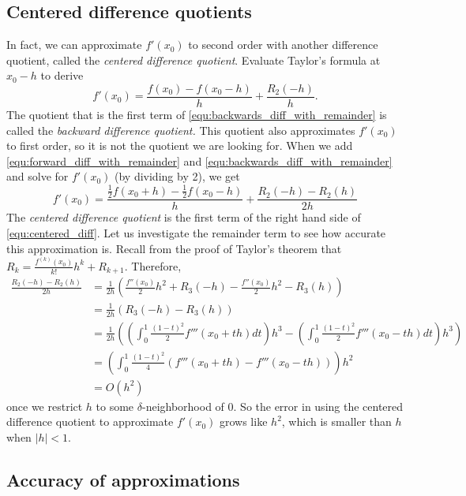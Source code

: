 \subsection*{Centered difference quotients}
In fact, we can approximate $f'(x_0)$ to second order with another difference quotient, called the \emph{centered difference quotient}. 
Evaluate Taylor's formula at $x_0-h$ to derive
\begin{equation}\label{equ:backwards_diff_with_remainder}
f'(x_0) = \frac{f(x_0)-f(x_0-h)}{h} + \frac{R_2(-h)}{h}.
\end{equation}
The quotient that is the first term of \eqref{equ:backwards_diff_with_remainder} is called the \emph{backward difference quotient.} 
This quotient also approximates $f'(x_0)$ to first order, so it is not the quotient we are looking for. 
When we add \eqref{equ:forward_diff_with_remainder} and \eqref{equ:backwards_diff_with_remainder} and solve for $f'(x_0)$ (by dividing by 2), we get
\begin{equation}\label{equ:centered_diff}
f'(x_0) = \frac{\frac{1}{2}f(x_0+h) - \frac{1}{2}f(x_0-h)}{h} + \frac{R_2(-h) - R_2(h)}{2h}
\end{equation}
The \emph{centered difference quotient} is the first term of the right hand side of \eqref{equ:centered_diff}. 
Let us investigate the remainder term to see how accurate this approximation is. 
Recall from the proof of Taylor's theorem that $R_k = \frac{f^{(k)}(x_0)}{k!}h^k + R_{k+1}$. Therefore,
\begin{align*}
\frac{R_2(-h) - R_2(h)}{2h} &= \frac{1}{2h}\left(\frac{f''(x_0)}{2}h^2 + R_{3}(-h) - \frac{f''(x_0)}{2}h^2 - R_{3}(h) \right)\\
&= \frac{1}{2h} ( R_3(-h)-R_3(h))\\
&= \frac{1}{2h}\left(  \left( \int_0^1 \frac{(1-t)^2}{2} f'''(x_0+th) dt \right) h^3  -  \left(\int_0^1 \frac{(1-t)^2}{2} f'''(x_0-th) dt \right) h^3  \right)\\
&= \left(  \int_0^1 \frac{(1-t)^2}{4}( f'''(x_0+th)-f'''(x_0-th)) \right)h^2\\
&=  O(h^2)
\end{align*}
once we restrict $h$ to some $\delta$-neighborhood of 0. 
So the error in using the centered difference quotient to approximate $f'(x_0)$ grows like $h^2$, which is smaller than $h$ when $|h|<1$.

\subsection*{Accuracy of approximations}

